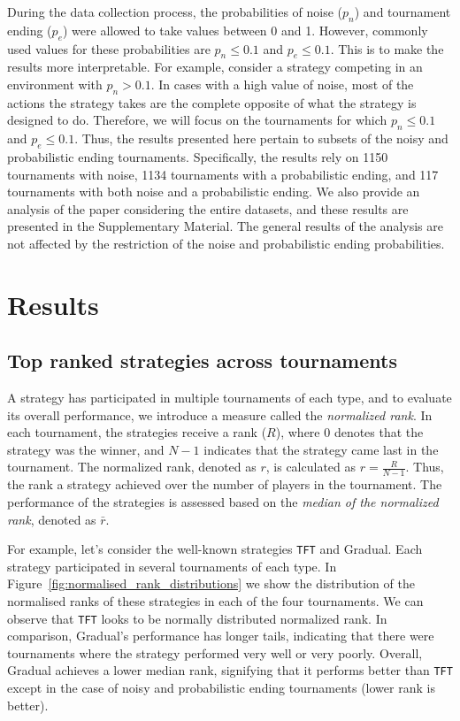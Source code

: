 \documentclass{article}
\def\TFT{\texttt{TFT}}
\begin{document}
During the data collection process, the probabilities of noise (\(p_n\)) and
tournament ending (\(p_e\)) were allowed to take values between 0 and 1.
However, commonly used values for these probabilities are \(p_n \leq 0.1\) and
\(p_e \leq 0.1\). This is to make the results more interpretable. For example,
consider a strategy competing in an environment with \(p_n > 0.1\). In cases
with a high value of noise, most of the actions the strategy takes are the
complete opposite of what the strategy is designed to do. Therefore, we will
focus on the tournaments for which \(p_n \leq 0.1\) and \(p_e \leq 0.1\). Thus,
the results presented here pertain to subsets of the noisy and probabilistic
ending tournaments. Specifically, the results rely on 1150 tournaments with
noise, 1134 tournaments with a probabilistic ending, and 117 tournaments with
both noise and a probabilistic ending. We also provide an analysis of the paper
considering the entire datasets, and these results are presented in the
Supplementary Material. The general results of the analysis are not affected by
the restriction of the noise and probabilistic ending probabilities.

\section{Results}
\subsection{Top ranked strategies across tournaments}\label{section:top_performances}

A strategy has participated in multiple tournaments of each type, and to
evaluate its overall performance, we introduce a measure called the {\it
normalized rank}. In each tournament, the strategies receive a rank (\(R\)), where 0
denotes that the strategy was the winner, and \(N-1\) indicates that the
strategy came last in the tournament. The normalized rank, denoted as \(r\), is
calculated as \(r = \frac{R}{N-1}\). Thus, the rank a strategy achieved over the
number of players in the tournament. The performance of the strategies is
assessed based on the {\it median of the normalized rank}, denoted as
\(\bar{r}\).

For example, let's consider the well-known strategies \TFT{} and Gradual. Each
strategy participated in several tournaments of each type. In
Figure~\ref{fig:normalised_rank_distributions} we show the distribution of the
normalised ranks of these strategies in each of the four tournaments. We can
observe that \TFT{} looks to be normally distributed normalized rank. In comparison,
Gradual's performance has longer tails, indicating that there were tournaments
where the strategy performed very well or very poorly. Overall, Gradual achieves
a lower median rank, signifying that it performs better than \TFT{} except in
the case of noisy and probabilistic ending tournaments (lower rank is better).
\end{document}
